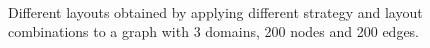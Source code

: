 {\begin{figure}[p]
\begin{adjustwidth}{0cm}{-1cm}
{  }
	\hfill
		\\[5mm]
    \end{adjustwidth}  
  \caption[Different layouts for a graph with 3 domains, 200 nodes and 200 edges.]{Different layouts obtained by applying different strategy and layout combinations to a graph with 3 domains, 200 nodes and 200 edges.}%
  \label{fig:ex3}
\end{figure}
  \cleartoodd
}


